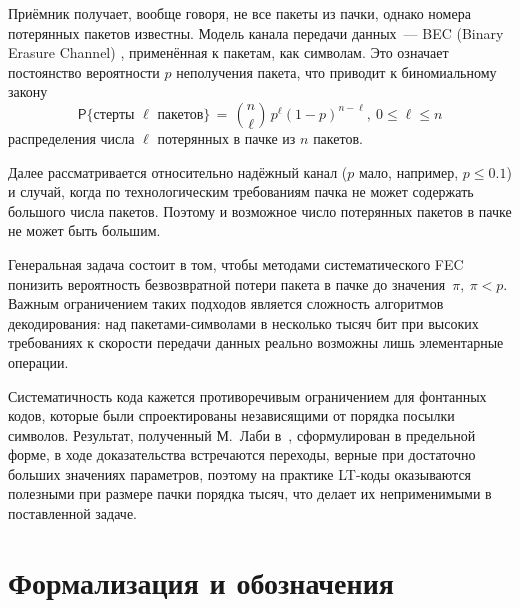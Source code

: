 Приёмник получает, вообще говоря, не все пакеты из пачки, однако номера потерянных пакетов известны.
%
Модель канала передачи данных~--- BEC (Binary Erasure Channel) \cite{Kythe2012}, применённая к пакетам, как символам.
Это означает постоянство 
вероятности $p$ неполучения пакета, что приводит к биномиальному закону
$$  
\mathsf P\{\text{стерты } \ell \text{ пакетов}\}\,=\,
\binom{n}{\ell}\, p^\ell(1-p)^{n-\ell},\: 0\le\ell\le n
$$
распределения числа $\ell$ потерянных в пачке из $n$ пакетов.

Далее рассматривается относительно надёжный канал ($p$ мало, например, $p\le0.1$) и случай,
когда по технологическим требованиям пачка не может содержать большого числа пакетов.
Поэтому и возможное число потерянных пакетов в пачке не может быть большим.

Генеральная задача состоит в том, чтобы методами систематического FEC понизить вероятность безвозвратной потери пакета в пачке до значения~$\pi,\:\pi<p$.
Важным ограничением таких подходов является сложность алгоритмов декодирования: над пакетами-символами в несколько тысяч бит
при высоких требованиях к скорости передачи данных реально возможны лишь элементарные операции.

Систематичность кода кажется противоречивым ограничением для фонтанных кодов, которые были спроектированы независящими от порядка посылки символов.
Результат, полученный М.~Лаби в~\cite{Luby}, сформулирован в предельной форме, в ходе доказательства встречаются переходы, верные
при достаточно больших значениях параметров, поэтому на практике LT-коды оказываются полезными при размере пачки порядка тысяч, что делает их неприменимыми в поставленной задаче.

\section{Формализация и обозначения}

